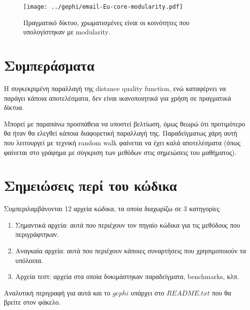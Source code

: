 \documentclass[10pt, letterpaper]{article}
\begin{document}
\begin{figure}
  \centering
  \texttt{[image: ../gephi/email-Eu-core-modularity.pdf]}
  \caption{Πραγματικό δίκτυο, χρωματισμένες είναι οι κοινότητες που υπολογίστηκαν με \textlatin{modularity}.}
  \label{Eu-modularity}
\end{figure}


\pagebreak

\section{Συμπεράσματα}


Η συγκεκριμένη παραλλαγή της \textlatin{distance quality function}, ενώ καταφέρνει να 
παράγει κάποια αποτελέσματα, δεν είναι ικανοποιητικά για χρήση σε πραγματικά δίκτυα. 


Μπορεί με παραπάνω προσπάθεια να υποστεί βελτίωση, όμως θεωρώ 
ότι προτιμότερο θα ήταν θα ελεγθεί κάποια διαφορετική παραλλαγή της. Παραδείγματως χάρη 
αυτή που λειτουργεί με τεχνική \textlatin{random walk} φαίνεται να έχει καλά αποτελέσματα 
(όπως φαίνεται στο γράφημα με σύγκριση των μεθόδων στις σημειώσεις του μαθήματος).




\section{Σημειώσεις περί του κώδικα}

Συμπεριλαμβάνονται 12 αρχεία κώδικα, τα οποία διαχωρίζω σε 3 κατηγορίες 

\begin{enumerate}
  \item Σημαντικά αρχεία: αυτά που περιέχουν τον πηγαίο κώδικα για τις μεθόδους που περιγράφτηκαν.
  \item Αναγκαία αρχεία: αυτά που περιέχουν κάποιες συναρτήσεις που χρησιμοποιούν τα υπόλοιπα.
  \item Αρχεία τεστ: αρχεία στα οποία δοκιμάστηκαν παραδείγματα, \textlatin{benchmarks}, κλπ.
\end{enumerate}

Αναλυτική περιγραφή για αυτά και το $gephi$ υπάρχει στο $README.txt$ που θα βρείτε στον φάκελο.



\renewcommand{\refname}{\selectlanguage{greek} Αναφορές}  


\end{document}
